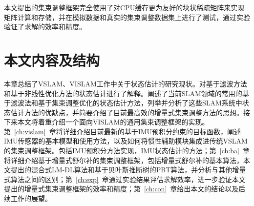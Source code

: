 本文提出的集束调整框架完全使用了对CPU缓存更为友好的块状稀疏矩阵来实现矩阵计算和存储，并在模拟数据和真实的集束调整数据集上进行了测试，通过实验验证了求解的效率和精度。




\section{本文内容及结构}

本章总结了VSLAM、VISLAM工作中关于状态估计的研究现状。对基于滤波方法和基于非线性优化方法的状态估计进行了解释。阐述了当前SLAM领域的常用的基于滤波法和基于集束调整优化的状态估计方法，列举并分析了这些SLAM系统中状态估计方法的优缺点，并简要介绍了目前最高效的增量式集束调整方法的思想。接下来本文将着重介绍一个面向VISLAM的通用集束调整框架的实现。第~\ref{ch:vislam}~章将详细介绍目前最新的基于IMU预积分约束的目标函数，阐述IMU传感器的基本模型和使用方法，以及如何将惯性辅助模块集成进传统VSLAM的集束调整框架。包括IMU预积分方法实现，IMU状态估计的方法；第~\ref{ch:ba}~章将详细介绍基于增量式舒尔补的集束调整框架，包括增量式舒尔补的基本算法，本文提出的混合式LM-DL算法和基于贝叶斯推断树的PBT算法，并分析与其他增量式算法之间的区别；第~\ref{ch:exp}~章通过实验结果评估求解效率，进一步验证本文提出的增量式集束调整框架的效率和精度；第~\ref{ch:con}~章给出本文的结论以及后续工作的展望。
